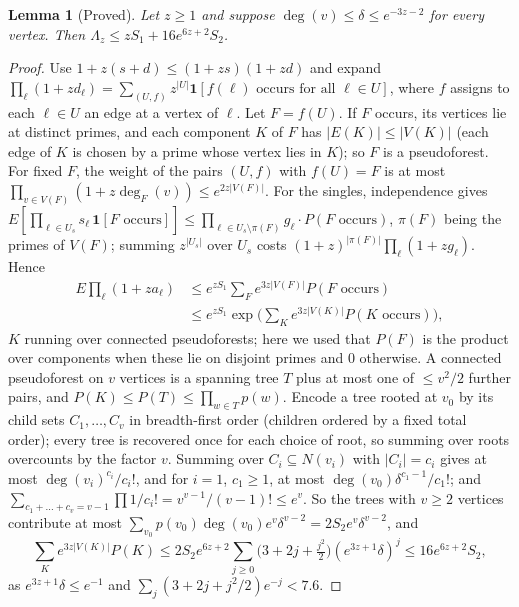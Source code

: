 \documentclass[11pt,reqno]{amsart}
\newtheorem{lemma}[theorem]{Lemma}
\theoremstyle{definition}
\begin{document}
\begin{lemma}[Proved]\label{lem:pseudo}
Let $z\ge1$ and suppose $\deg(v)\le\delta\le e^{-3z-2}$ for every vertex.  Then
$\Lambda_z\le zS_1+16e^{6z+2}S_2$.
\end{lemma}

\begin{proof}
Use $1+z(s+d)\le(1+zs)(1+zd)$ and expand
$\prod_\ell(1+zd_\ell)=\sum_{(U,f)}z^{|U|}\mathbf 1[f(\ell)\text{ occurs for all }\ell\in U]$,
where $f$ assigns to each $\ell\in U$ an edge at a vertex of $\ell$.  Let
$F=f(U)$.  If $F$ occurs, its vertices lie at distinct primes, and each
component $K$ of $F$ has $|E(K)|\le|V(K)|$ (each edge of $K$ is chosen by a prime
whose vertex lies in $K$); so $F$ is a pseudoforest.  For fixed $F$, the weight
of the pairs $(U,f)$ with $f(U)=F$ is at most
$\prod_{v\in V(F)}(1+z\deg_F(v))\le e^{2z|V(F)|}$.  For the singles,
independence gives
$E[\prod_{\ell\in U_s}s_\ell\,\mathbf 1[F\text{ occurs}]]\le\prod_{\ell\in U_s\setminus\pi(F)}g_\ell\cdot P(F\text{ occurs})$,
$\pi(F)$ being the primes of $V(F)$; summing $z^{|U_s|}$ over $U_s$ costs
$(1+z)^{|\pi(F)|}\prod_\ell(1+zg_\ell)$.  Hence
\begin{align*}
 E\prod_\ell(1+za_\ell)&\le e^{zS_1}\sum_Fe^{3z|V(F)|}P(F\text{ occurs})\\
 &\le e^{zS_1}\exp\Big(\sum_Ke^{3z|V(K)|}P(K\text{ occurs})\Big),
\end{align*}
$K$ running over connected pseudoforests; here we used that $P(F)$ is the
product over components when these lie on disjoint primes and $0$ otherwise.
A connected pseudoforest on $v$ vertices is a spanning tree $T$ plus at most one
of $\le v^2/2$ further pairs, and $P(K)\le P(T)\le\prod_{w\in T}p(w)$.  Encode a
tree rooted at $v_0$ by its child sets $C_1,\dots,C_v$ in breadth-first order
(children ordered by a fixed total order); every tree is recovered once for
each choice of root, so summing over roots overcounts by the factor $v$.
Summing over $C_i\subseteq N(v_i)$ with $|C_i|=c_i$ gives at most
$\deg(v_i)^{c_i}/c_i!$, and for $i=1$, $c_1\ge1$, at most
$\deg(v_0)\delta^{c_1-1}/c_1!$; and
$\sum_{c_1+\dots+c_v=v-1}\prod1/c_i!=v^{v-1}/(v-1)!\le e^v$.  So the trees with
$v\ge2$ vertices contribute at most
$\sum_{v_0}p(v_0)\deg(v_0)e^v\delta^{v-2}=2S_2e^v\delta^{v-2}$, and
\[
 \sum_Ke^{3z|V(K)|}P(K)\le2S_2e^{6z+2}\sum_{j\ge0}\big(3+2j+\tfrac{j^2}2\big)(e^{3z+1}\delta)^j\le16e^{6z+2}S_2,
\]
as $e^{3z+1}\delta\le e^{-1}$ and $\sum_j(3+2j+j^2/2)e^{-j}<7.6$.
\end{proof}
\end{document}

